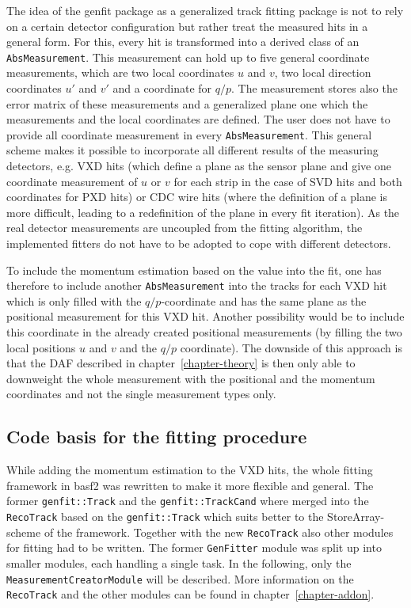 The idea of the genfit package as a generalized track fitting package is not to rely on a certain detector configuration but rather treat the measured hits in a general form. For this, every hit is transformed into a derived class of an \texttt{AbsMeasurement}. This measurement can hold up to five general coordinate measurements, which are two local coordinates $u$ and $v$, two local direction coordinates $u'$ and $v'$ and a coordinate for $q/p$. The measurement stores also the error matrix of these measurements and a generalized plane one which the measurements and the local coordinates are defined. The user does not have to provide all coordinate measurement in every \texttt{AbsMeasurement}. This general scheme makes it possible to incorporate all different results of the measuring detectors, e.g. VXD hits (which define a plane as the sensor plane and give one coordinate measurement of $u$ or $v$ for each strip in the case of SVD hits and both coordinates for PXD hits) or CDC wire hits (where the definition of a plane is more difficult, leading to a redefinition of the plane in every fit iteration). As the real detector measurements are uncoupled from the fitting algorithm, the implemented fitters do not have to be adopted to cope with different detectors.

To include the momentum estimation based on the \dedx value into the fit, one has therefore to include another \texttt{AbsMeasurement} into the tracks for each VXD hit which is only filled with the $q/p$-coordinate and has the same plane as the positional measurement for this VXD hit. Another possibility would be to include this coordinate in the already created positional measurements (by filling the two local positions $u$ and $v$ and the $q/p$ coordinate). The downside of this approach is that the DAF described in chapter~\ref{chapter-theory} is then only able to downweight the whole measurement with the positional and the momentum coordinates and not the single measurement types only.

\subsection{Code basis for the fitting procedure}

While adding the momentum estimation to the VXD hits, the whole fitting framework in basf2 was rewritten to make it more flexible and general. The former \texttt{genfit::Track} and the \texttt{genfit::TrackCand} where merged into the \texttt{RecoTrack} based on the \texttt{genfit::Track} which suits better to the StoreArray-scheme of the framework. Together with the new \texttt{RecoTrack} also other modules for fitting had to be written. The former \texttt{GenFitter} module was split up into smaller modules, each handling a single task. In the following, only the \texttt{MeasurementCreatorModule} will be described. More information on the \texttt{RecoTrack} and the other modules can be found in chapter~\ref{chapter-addon}.

